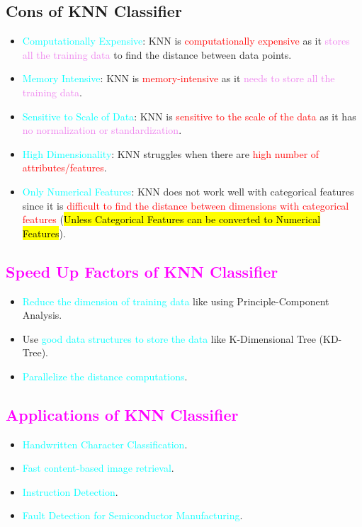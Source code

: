 \documentclass{book}
\begin{document}
\subsection{Cons of KNN Classifier}
\begin{itemize}
    \item \textcolor{cyan}{Computationally Expensive}: KNN is \textcolor{red}{computationally expensive} as it \textcolor{violet}{stores all the training data} to find the distance between data points.
    \item \textcolor{cyan}{Memory Intensive}: KNN is \textcolor{red}{memory-intensive} as it \textcolor{violet}{needs to store all the training data}.
    \item \textcolor{cyan}{Sensitive to Scale of Data}: KNN is \textcolor{red}{sensitive to the scale of the data} as it has \textcolor{violet}{no normalization or standardization}.
    \item \textcolor{cyan}{High Dimensionality}: KNN struggles when there are \textcolor{red}{high number of attributes/features}.
    \item \textcolor{cyan}{Only Numerical Features}: KNN does not work well with categorical features since it is \textcolor{red}{difficult to find the distance between dimensions with categorical features} (\hl{Unless Categorical Features can be converted to Numerical Features}).
\end{itemize}
\textcolor{magenta}{\section{\textbf{Speed Up Factors of KNN Classifier}}}
\begin{itemize}
    \item \textcolor{cyan}{Reduce the dimension of training data} like using Principle-Component Analysis.
    \item Use \textcolor{cyan}{good data structures to store the data} like K-Dimensional Tree (KD-Tree).
    \item \textcolor{cyan}{Parallelize the distance computations}.
\end{itemize}
\textcolor{magenta}{\section{\textbf{Applications of KNN Classifier}}}
\begin{itemize}
    \item \textcolor{cyan}{Handwritten Character Classification}.
    \item \textcolor{cyan}{Fast content-based image retrieval}.
    \item \textcolor{cyan}{Instruction Detection}.
    \item \textcolor{cyan}{Fault Detection for Semiconductor Manufacturing}.
\end{itemize}
\end{document}
